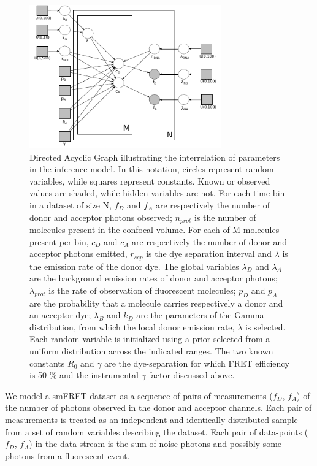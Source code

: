 \begin{figure}[b]
   \begin{center}
      \includegraphics*[width=3.25in]{inference/S2_plate_DAG_model.pdf}
      \caption{Directed Acyclic Graph illustrating the interrelation of parameters in the inference model.  In this notation, circles represent random variables, while squares represent constants.  Known or observed values are shaded, while hidden variables are not.  For each time bin in a dataset of size N, $f_D$ and $f_A$ are respectively the number of donor and acceptor photons observed; $n_{prot}$ is the number of molecules present in the confocal volume.  For each of M molecules present per bin, $c_{D}$ and $c_{A}$ are respectively the number of donor and acceptor photons emitted, $r_{sep}$ is the dye separation interval and $\lambda$ is the emission rate of the donor dye.  The global variables $\lambda_{D}$ and $\lambda_{A}$ are the background emission rates of donor and acceptor photons; $\lambda_{prot}$ is the rate of observation of fluorescent molecules; $p_{D}$ and $p_{A}$ are the probability that a molecule carries respectively a donor and an acceptor dye; $\lambda_B$ and $k_D$ are the parameters of the Gamma-distribution, from which the local donor emission rate, $\lambda$ is selected.  Each random variable is initialized using a prior selected from a uniform distribution across the indicated ranges.  The two known constants $R_0$ and $\gamma$ are the dye-separation for which FRET efficiency is 50 \% and the instrumental $\gamma$-factor discussed above.}
      \label{fig:plate_DAG}
   \end{center}
\end{figure}


We model a smFRET dataset as a sequence of pairs of measurements ($f_D$, $f_A$) of the number of photons observed in the donor and acceptor channels. Each pair of measurements is treated as an independent and identically distributed sample from a set of random variables describing the dataset. Each pair of data-points ($f_D$, $f_A$) in the data stream is the sum of noise photons and possibly some photons from a fluorescent event. 

